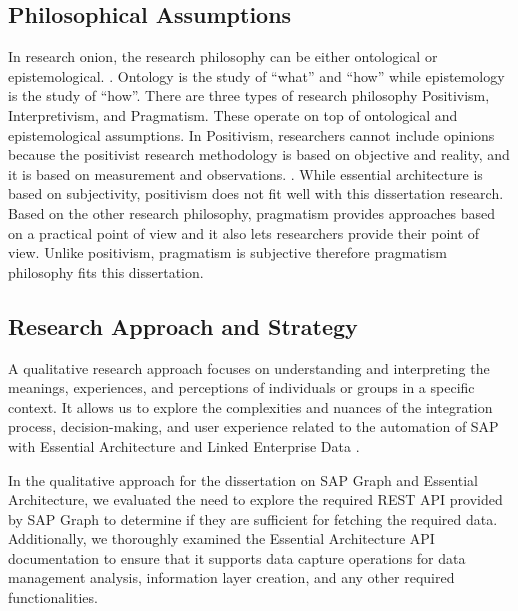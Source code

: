 \documentclass{article}
\begin{document}
\maketitle
\subsection{Philosophical Assumptions}
In research onion, the research philosophy can be either ontological or epistemological. \parencite{alababneh2020}. Ontology is the study of “what” and “how” while epistemology is the study of “how”. There are three types of research philosophy Positivism, Interpretivism, and Pragmatism. These operate on top of ontological and epistemological assumptions. In Positivism, researchers cannot include opinions because the positivist research methodology is based on objective and reality, and it is based on measurement and observations. \parencite{goldkuhl2012}. While essential architecture is based on subjectivity, positivism does not fit well with this dissertation research. Based on the other research philosophy, pragmatism provides approaches based on a practical point of view and it also lets researchers provide their point of view. Unlike positivism, pragmatism is subjective therefore pragmatism philosophy fits this dissertation.

\maketitle
\subsection{Research Approach and Strategy}
A qualitative research approach focuses on understanding and interpreting the meanings, experiences, and perceptions of individuals or groups in a specific context. It allows us to explore the complexities and nuances of the integration process, decision-making, and user experience related to the automation of SAP with Essential Architecture and Linked Enterprise Data \parencite{hammarberg2016}.

In the qualitative approach for the dissertation on SAP Graph and Essential Architecture, we evaluated the need to explore the required REST API provided by SAP Graph to determine if they are sufficient for fetching the required data. Additionally, we thoroughly examined the Essential Architecture API documentation to ensure that it supports data capture operations for data management analysis, information layer creation, and any other required functionalities.
\end{document}
